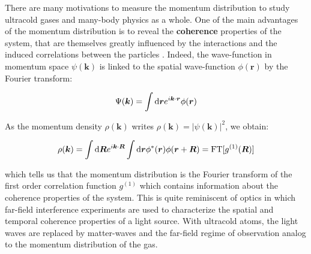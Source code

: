 



There are many motivations to measure the momentum distribution to study ultracold gases and many-body physics as a whole. One of the main advantages of the momentum distribution is to reveal the \textbf{coherence} properties of the system, that are themselves greatly influenced by the interactions and the induced correlations between the particles \cite{greiner2002quantum}. Indeed, the wave-function in momentum space $\psi(\bm{k})$ is linked to the spatial wave-function $\phi(\bm{r})$ by the Fourier transform:

\begin{equation}
    \Psi(\bm{k}) = \int {\rm d}\bm{r} e^{i \bm{k} \cdot \bm{r}} \phi(\bm{r})
\end{equation}

\noindent As the momentum density $\rho(\bm{k})$ writes $\rho(\bm{k})= |\psi(\bm{k})|^2$, we obtain:

\begin{equation}
    \rho(\bm{k}) = \int {\rm d}\bm{R} e^{i \bm{k} \cdot \bm{R}} \int {\rm d}\bm{r} \phi^* (\bm{r}) \phi(\bm{r}+\bm{R}) = \text{FT} [g^{(1)} (\bm{R})]
\end{equation}

\noindent which tells us that the momentum distribution is the Fourier transform of the first order correlation function $g^{(1)}$ which contains information about the coherence properties of the system.
This is quite reminiscent of optics in which far-field interference experiments are used to characterize the spatial and temporal coherence properties of a light source. With ultracold atoms, the light waves are replaced by matter-waves and the far-field regime of observation analog to the momentum distribution of the gas.

